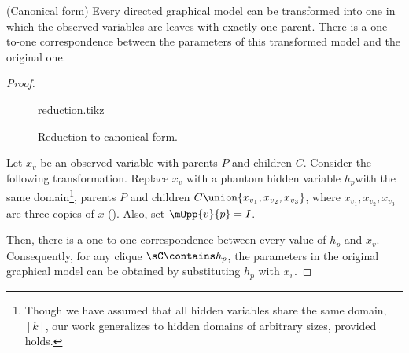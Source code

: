 \begin{lemma}(Canonical form) 
  \label{lem:reduction}
Every directed graphical model can be transformed into one in which
  the observed variables are leaves with exactly one parent. 
There is a one-to-one correspondence between the parameters of this
  transformed model and the original one.
\end{lemma}
\begin{proof}
  \begin{figure}
    \centering
    {reduction.tikz}
    \caption{Reduction to canonical form.}
    \label{fig:reduction}
  \end{figure}

  \providecommand{\hp}{\ensuremath{h_p}}

  Let $x_v$ be an observed variable with parents $P$ and children $C$.
  Consider the following transformation.
  Replace $x_v$ with a phantom hidden variable \hp with the same 
  domain\footnote{Though we have assumed that all hidden variables share the
      same domain, $[k]$, our work generalizes to hidden domains of
      arbitrary sizes, provided  holds.},
  parents $P$ and children $C \union \{x_{v_1}, x_{v_2}, x_{v_3}\}$,
  where $x_{v_1},x_{v_2},x_{v_3}$ are three copies of $x$
  (). Also, set $\mOpp{v}{p} = I$.

  Then, there is a one-to-one correspondence between every value of
  $\hp$ and $x_v$. Consequently, for any clique $\sC \contains \hp$, the
  parameters in the original graphical model can be obtained by
  substituting $\hp$ with $x_v$.
\end{proof}

